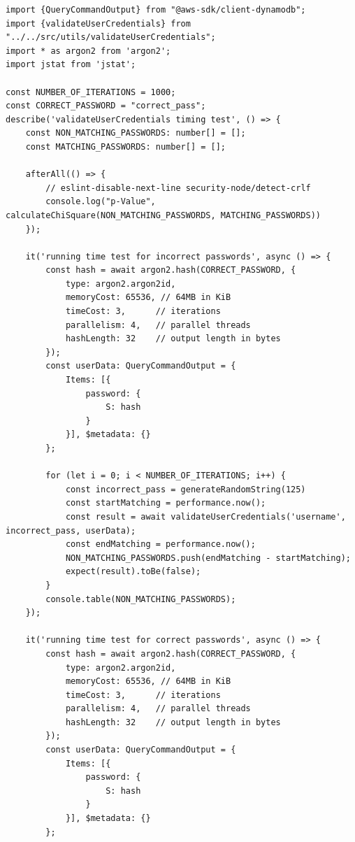 \begin{lstlisting}[style=typescript,caption=Timing test for Hash Comparision,label=apendix:timing_test]
import {QueryCommandOutput} from "@aws-sdk/client-dynamodb";
import {validateUserCredentials} from "../../src/utils/validateUserCredentials";
import * as argon2 from 'argon2';
import jstat from 'jstat';

const NUMBER_OF_ITERATIONS = 1000;
const CORRECT_PASSWORD = "correct_pass";
describe('validateUserCredentials timing test', () => {
    const NON_MATCHING_PASSWORDS: number[] = [];
    const MATCHING_PASSWORDS: number[] = [];

    afterAll(() => {
        // eslint-disable-next-line security-node/detect-crlf
        console.log("p-Value", calculateChiSquare(NON_MATCHING_PASSWORDS, MATCHING_PASSWORDS))
    });

    it('running time test for incorrect passwords', async () => {
        const hash = await argon2.hash(CORRECT_PASSWORD, {
            type: argon2.argon2id,
            memoryCost: 65536, // 64MB in KiB
            timeCost: 3,      // iterations
            parallelism: 4,   // parallel threads
            hashLength: 32    // output length in bytes
        });
        const userData: QueryCommandOutput = {
            Items: [{
                password: {
                    S: hash
                }
            }], $metadata: {}
        };

        for (let i = 0; i < NUMBER_OF_ITERATIONS; i++) {
            const incorrect_pass = generateRandomString(125)
            const startMatching = performance.now();
            const result = await validateUserCredentials('username', incorrect_pass, userData);
            const endMatching = performance.now();
            NON_MATCHING_PASSWORDS.push(endMatching - startMatching);
            expect(result).toBe(false);
        }
        console.table(NON_MATCHING_PASSWORDS);
    });

    it('running time test for correct passwords', async () => {
        const hash = await argon2.hash(CORRECT_PASSWORD, {
            type: argon2.argon2id,
            memoryCost: 65536, // 64MB in KiB
            timeCost: 3,      // iterations
            parallelism: 4,   // parallel threads
            hashLength: 32    // output length in bytes
        });
        const userData: QueryCommandOutput = {
            Items: [{
                password: {
                    S: hash
                }
            }], $metadata: {}
        };


\end{lstlisting}

